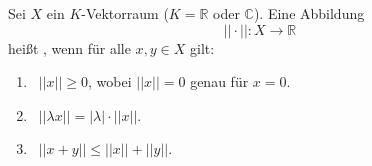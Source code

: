 Sei $X$ ein $K$-Vektorraum ($K = \mathbb{R}$ oder $\mathbb{C}$). Eine Abbildung
$$||\cdot||: X \to \mathbb{R}$$
heißt , wenn für alle $x, y \in X$ gilt:
\begin{enumerate}[label="",leftmargin=*]
    \item {} \, $||x|| \geq 0$, wobei $||x|| = 0$ genau für $x = 0$.
    \item {} \, $||\lambda x|| = |\lambda| \cdot ||x||$.
    \item {} \, $||x+y|| \leq ||x|| + ||y||$.
\end{enumerate}